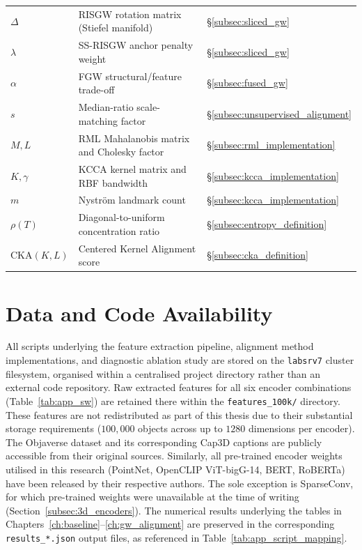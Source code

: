 \begin{longtable}{lll}
$\Delta$                 & RISGW rotation matrix (Stiefel manifold) & \S\ref{subsec:sliced_gw} \\
$\lambda$                & SS-RISGW anchor penalty weight & \S\ref{subsec:sliced_gw} \\
$\alpha$                 & FGW structural/feature trade-off & \S\ref{subsec:fused_gw} \\
$s$                      & Median-ratio scale-matching factor & \S\ref{subsec:unsupervised_alignment} \\
$M, L$                    & RML Mahalanobis matrix and Cholesky factor & \S\ref{subsec:rml_implementation} \\
$K, \gamma$                & KCCA kernel matrix and RBF bandwidth & \S\ref{subsec:kcca_implementation} \\
$m$                      & Nystr\"{o}m landmark count & \S\ref{subsec:kcca_implementation} \\
$\rho(T)$                 & Diagonal-to-uniform concentration ratio & \S\ref{subsec:entropy_definition} \\
$\mathrm{CKA}(K,L)$        & Centered Kernel Alignment score & \S\ref{subsec:cka_definition} \\
\end{longtable}
\endgroup

\section{Data and Code Availability}
\label{sec:app_data_availability}

All scripts underlying the feature extraction pipeline, alignment method implementations, and diagnostic ablation study are stored on the \texttt{labsrv7} cluster filesystem, organised within a centralised project directory rather than an external code repository. Raw extracted features for all six encoder combinations (Table~\ref{tab:app_sw}) are retained there within the \texttt{features\_100k/} directory. These features are not redistributed as part of this thesis due to their substantial storage requirements ($100{,}000$ objects across up to $1280$ dimensions per encoder). The Objaverse dataset \cite{deitke2023objaverse} and its corresponding Cap3D captions \cite{luo2023scalable} are publicly accessible from their original sources. Similarly, all pre-trained encoder weights utilised in this research (PointNet, OpenCLIP ViT-bigG-14, BERT, RoBERTa) have been released by their respective authors. The sole exception is SparseConv, for which pre-trained weights were unavailable at the time of writing (Section~\ref{subsec:3d_encoders}). The numerical results underlying the tables in Chapters~\ref{ch:baseline}--\ref{ch:gw_alignment} are preserved in the corresponding \texttt{results\_*.json} output files, as referenced in Table~\ref{tab:app_script_mapping}.